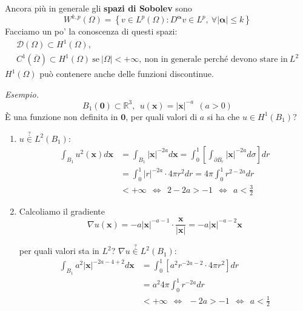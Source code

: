 \documentclass[10pt,a4paper,twoside,openright]{book}
\newcommand{\x}{\mathbf{x}}
\begin{document}
Ancora più in generale gli \textbf{spazi di Sobolev} sono
\begin{equation*}
	W^{k,p}( \Omega ) =\left\{v\in L^{p}( \Omega ) :D^{\mathbf{\alpha }} v\in L^{p} ,\ \forall | \mathbf{\alpha }| \leqslant k\right\}
\end{equation*}
Facciamo un po' la conoscenza di questi spazi:
\begin{gather*}
	\mathcal{D}( \Omega ) \subset H^{1}( \Omega ) ,\\
	C^{1}(\overline{\Omega }) \subset H^{1}( \Omega ) \ \text{se} \ | \Omega | < +\infty ,\ \text{non in generale perché devono stare in} \ L^{2}
\end{gather*}
$H^{1}( \Omega )$ può contenere anche delle funzioni discontinue.

\textit{Esempio.}
\begin{equation*}
	B_{1}(\mathbf{0}) \subset \mathbb{R}^{3} ,\ \ u(\x) =| \x| ^{-a} \ \ ( a >0)
\end{equation*}
È una funzione non definita in $\mathbf{0}$, per quali valori di $a$ si ha che $u\in H^{1}( B_{1})$?
\begin{enumerate}
	\item $u\overset{?}{\in } L^{2}( B_{1}) :$\begin{align*}
	      \int _{B_{1}} u^{2}(\x) d\x & =\int _{B_{1}}| \x| ^{-2a} d\x =\int ^{1}_{0}\left[\int _{\partial B_{r}}| \x| ^{-2a} d\sigma \right] dr\\
	      & =\int ^{1}_{0}| r| ^{-2a} \cdotp 4\pi r^{2} dr=4\pi \int ^{1}_{0} r^{2-2a} dr\\
	      & < +\infty \ \ \Leftrightarrow \ \ 2-2a >-1\ \ \Leftrightarrow \ \ a< \frac{3}{2}
	\end{align*}
	\item Calcoliamo il gradiente\begin{equation*}
	      \nabla u(\x) =-a| \x| ^{-a-1} \cdotp \frac{\x}{| \x| } =-a| \x| ^{-a-2}\x
	\end{equation*}
	
	per quali valori sta in $L^{2}$? $\nabla u\overset{?}{\in } L^{2}( B_{1}) :$\begin{align*}
	\int _{B_{1}} a^{2}| \x| ^{-2a-4+2} d\x & =\int ^{1}_{0}\left[ a^{2} r^{-2a-2} \cdotp 4\pi r^{2}\right] dr\\
	& =a^{2} 4\pi \int ^{1}_{0} r^{-2a} dr\\
	& < +\infty \ \ \Leftrightarrow \ \ -2a >-1\ \ \Leftrightarrow \ \ a< \frac{1}{2}
	\end{align*}
\end{enumerate}
\end{document}

